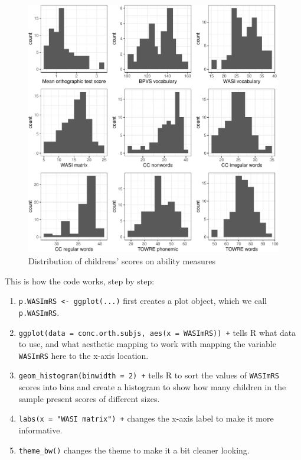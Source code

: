\documentclass[
  letterpaper,
  DIV=11,
  numbers=noendperiod]{scrreprt}
\providecommand{\tightlist}{%
  \setlength{\itemsep}{0pt}\setlength{\parskip}{0pt}}\usepackage{longtable,booktabs,array}
\begin{document}
\begin{figure}[H]

{\centering \includegraphics{visualization_files/figure-pdf/fig-hist-grid-1.pdf}

}

\caption{\label{fig-hist-grid}Distribution of childrens' scores on
ability measures}

\end{figure}

This is how the code works, step by step:

\begin{enumerate}
\def\labelenumi{\arabic{enumi}.}
\tightlist
\item
  \texttt{p.WASImRS\ \textless{}-\ ggplot(...)} first creates a plot
  object, which we call \texttt{p.WASImRS}.
\item
  \texttt{ggplot(data\ =\ conc.orth.subjs,\ aes(x\ =\ WASImRS))\ +}
  tells R what data to use, and what aesthetic mapping to work with
  mapping the variable \texttt{WASImRS} here to the x-axis location.
\item
  \texttt{geom\_histogram(binwidth\ =\ 2)\ +} tells R to sort the values
  of \texttt{WASImRS} scores into bins and create a histogram to show
  how many children in the sample present scores of different sizes.
\item
  \texttt{labs(x\ =\ "WASI\ matrix")\ +} changes the x-axis label to
  make it more informative.
\item
  \texttt{theme\_bw()} changes the theme to make it a bit cleaner
  looking.
\end{enumerate}
\end{document}
